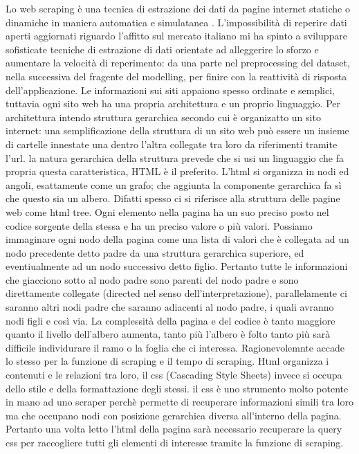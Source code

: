 \documentclass[
  12pt,
  a4paper,
  oneside]{book}
\begin{document}
\citep{lovelace_geocomputation_2019, R-rvest}

Lo web scraping è una tecnica di estrazione dei dati da pagine internet statiche o dinamiche in maniera automatica e simulatanea \citep{wiki:xxx}. L'impossibilità di reperire dati aperti aggiornati riguardo l'affitto sul mercato italiano mi ha spinto a sviluppare sofisticate tecniche di estrazione di dati orientate ad alleggerire lo sforzo e aumentare la velocità di reperimento: da una parte nel preprocessing del dataset, nella successiva del fragente del modelling, per finire con la reattività di risposta dell'applicazione.
Le informazioni sui siti appaiono spesso ordinate e semplici, tuttavia ogni sito web ha una propria architettura e un proprio linguaggio. Per architettura intendo struttura gerarchica secondo cui è organizatto un sito internet: una semplificazione della struttura di un sito web può essere un insieme di cartelle innestate una dentro l'altra collegate tra loro da riferimenti tramite l'url. la natura gerarchica della struttura prevede che si usi un linguaggio che fa propria questa caratteristica, HTML è il preferito. L'html si organizza in nodi ed angoli, esattamente come un grafo; che aggiunta la componente gerarchica fa sì che questo sia un albero. Difatti spesso ci si riferisce alla struttura delle pagine web come html tree. Ogni elemento nella pagina ha un suo preciso posto nel codice sorgente della stessa e ha un preciso valore o più valori. Possiamo immaginare ogni nodo della pagina come una lista di valori che è collegata ad un nodo precedente detto padre da una struttura gerarchica superiore, ed eventiualmente ad un nodo successivo detto figlio. Pertanto tutte le informazioni che giacciono sotto al nodo padre sono parenti del nodo padre e sono direttamente collegate (directed nel senso dell'interpretazione), parallelamente ci saranno altri nodi padre che saranno adiacenti al nodo padre, i quali avranno nodi figli e così via.
La complessità della pagina e del codice è tanto maggiore quanto il livello dell'albero aumenta, tanto più l'albero è folto tanto più sarà difficile individurare il ramo o la foglia che ci interessa. Ragionevolemnte accade lo stesso per la funzione di scraping e il tempo di scraping.
Html organizza i contenuti e le relazioni tra loro, il css (Cascading Style Sheets) invece si occupa dello stile e della formattazione degli stessi. il css è uno strumento molto potente in mano ad uno scraper perchè permette di recuperare informazioni simili tra loro ma che occupano nodi con posizione gerarchica diversa all'interno della pagina. Pertanto una volta letto l'html della pagina sarà necessario recuperare la query css per raccogliere tutti gli elementi di interesse tramite la funzione di scraping.
\end{document}
